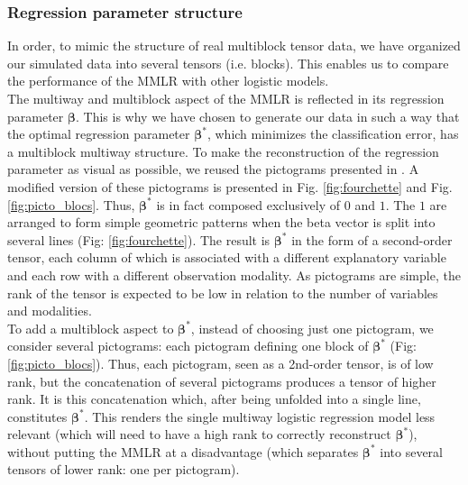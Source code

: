 \documentclass[preprint,12pt]{elsarticle}
\begin{document}
\subsubsection{Regression parameter structure}

\noindent In order, to mimic the structure of real multiblock tensor data, we have organized our simulated data into several tensors (i.e. blocks). This enables us to compare the performance of the MMLR with other logistic models.\\
\indent The multiway and multiblock aspect of the MMLR is reflected in its regression parameter $\bm{\beta}$. This is why we have chosen to generate our data in such a way that the optimal regression parameter $\bm{\beta}^*$, which minimizes the classification error, has a multiblock multiway structure. To make the reconstruction of the regression parameter as visual as possible, we reused the pictograms presented in \cite{picto}. A modified version of these pictograms is presented in Fig. \ref{fig:fourchette} and Fig. \ref{fig:picto_blocs}. Thus, $\bm{\beta}^*$ is in fact composed exclusively of $0$ and $1$. The $1$ are arranged to form simple geometric patterns when the beta vector is split into several lines (Fig: \ref{fig:fourchette}). The result is $\bm{\beta}^*$ in the form of a second-order tensor, each column of which is associated with a different explanatory variable and each row with a different observation modality. As pictograms are simple, the rank of the tensor is expected to be low in relation to the number of variables and modalities.\\
\indent To add a multiblock aspect to $\bm{\beta}^*$, instead of choosing just one pictogram, we consider several pictograms: each pictogram defining one block of $\bm{\beta}^*$ (Fig: \ref{fig:picto_blocs}). Thus, each pictogram, seen as a 2nd-order tensor, is of low rank, but the concatenation of several pictograms produces a tensor of higher rank. It is this concatenation which, after being unfolded into a single line, constitutes $\bm{\beta}^*$. This renders the single multiway logistic regression model less relevant (which will need to have a high rank to correctly reconstruct $\bm{\beta}^*$), without putting the MMLR at a disadvantage (which separates $\bm{\beta}^*$ into several tensors of lower rank: one per pictogram).
\end{document}
